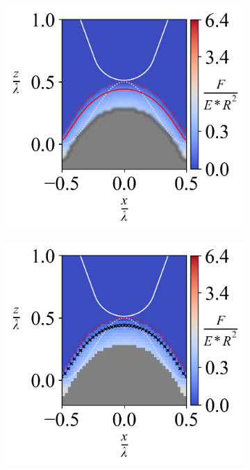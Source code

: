 \begin{figure}[H]
    
    \begin{subfigure}{0.32\textwidth}
        \centering
        \caption{\label{fig: All-Wave-ContourPlot-5}}
        \includegraphics[width=1\linewidth]{Figures/Wave-ContourPlot-5.png}
    \end{subfigure}   
    \hfill
   \begin{subfigure}{0.32\textwidth}
        \centering
        \caption{\label{fig: All-Wave-ContourPlotNI-5}}
        \includegraphics[width=1\linewidth]{Figures/Wave-ContourPlotNI-5.png}

\end{subfigure}
\end{figure}
